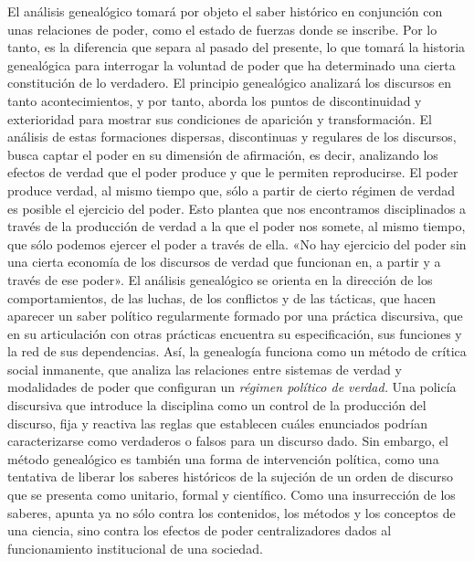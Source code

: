 El análisis genealógico tomará por objeto el saber histórico en conjunción con unas relaciones de poder, como el estado de fuerzas donde se inscribe. Por lo tanto, es la diferencia que separa al pasado del presente, lo que tomará la historia genealógica para interrogar la voluntad de poder que ha determinado una cierta constitución de lo verdadero. El principio genealógico analizará los discursos en tanto acontecimientos, y por tanto, aborda los puntos de discontinuidad y exterioridad para mostrar sus condiciones de aparición y transformación. El análisis de estas formaciones dispersas, discontinuas y regulares de los discursos, busca captar el poder en su dimensión de afirmación, es decir, analizando los efectos de verdad que el poder produce y que le permiten reproducirse. El poder produce verdad, al mismo tiempo que, sólo a partir de cierto régimen de verdad es posible el ejercicio del poder. Esto plantea que nos encontramos disciplinados a través de la producción de verdad a la que el poder nos somete, al mismo tiempo, que sólo podemos ejercer el poder a través de ella. «No hay ejercicio del poder sin una cierta economía de los discursos de verdad que funcionan en, a partir y a través de ese poder». El análisis genealógico se orienta en la dirección de los comportamientos, de las luchas, de los conflictos y de las tácticas, que hacen aparecer un saber político regularmente formado por una práctica discursiva, que en su articulación con otras prácticas encuentra su especificación, sus funciones y la red de sus dependencias. Así, la genealogía funciona como un método de crítica social inmanente, que analiza las relaciones entre sistemas de verdad y modalidades de poder que configuran un \emph{régimen político de verdad.} Una policía discursiva que introduce la disciplina como un control de la producción del discurso, fija y reactiva las reglas que establecen cuáles enunciados podrían caracterizarse como verdaderos o falsos para un discurso dado. Sin embargo, el método genealógico es también una forma de intervención política, como una tentativa de liberar los saberes históricos de la sujeción de un orden de discurso que se presenta como unitario, formal y científico. Como una insurrección de los saberes, apunta ya no sólo contra los contenidos, los métodos y los conceptos de una ciencia, sino contra los efectos de poder centralizadores dados al funcionamiento institucional de una sociedad.

